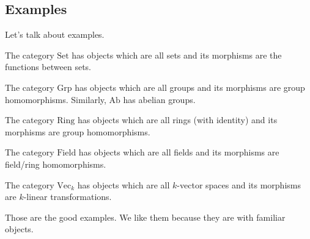 \subsection{Examples}
Let's talk about examples.
\begin{example}
	The category $\mathrm{Set}$ has objects which are all sets and its morphisms are the functions between sets.
\end{example}
\begin{example}
	The category $\mathrm{Grp}$ has objects which are all groups and its morphisms are group homomorphisms. Similarly, $\mathrm{Ab}$ has abelian groups.
\end{example}
\begin{example}
	The category $\mathrm{Ring}$ has objects which are all rings (with identity) and its morphisms are group homomorphisms.
\end{example}
\begin{example}
	The category $\mathrm{Field}$ has objects which are all fields and its morphisms are field/ring homomorphisms.
\end{example}
\begin{ex}
	The category $\mathrm{Vec}_k$ has objects which are all $k$-vector spaces and its morphisms are $k$-linear transformations.
\end{ex}
Those are the good examples. We like them because they are with familiar objects.

